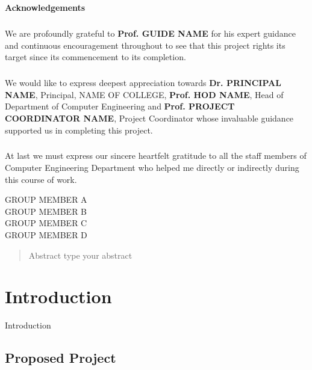 \documentclass[11pt]{report}
\begin{document}
\begin{center}
	\thispagestyle{empty}
	\LARGE{\textbf{Acknowledgements}}\\[1cm]
\end{center}
\linespread{1.13}
\large{\paragraph{}We are profoundly grateful to \textbf{Prof. GUIDE NAME} for his expert guidance
	and continuous encouragement throughout to see that this project rights its
	target since its commencement to its completion.}
\large{\paragraph{}We would like to express deepest appreciation towards \textbf{Dr. PRINCIPAL NAME},
	Principal, NAME OF COLLEGE, \textbf{Prof. HOD NAME}, 
	Head of Department of Computer Engineering and \textbf{Prof. PROJECT COORDINATOR NAME}, Project Coordinator whose
	invaluable guidance supported us in completing this project.}
\large{\paragraph{}At last we must express our sincere heartfelt gratitude to all the staff members
	of Computer Engineering Department who helped me directly or indirectly during this course of work.}
\begin{flushright}
	{
		GROUP MEMBER A\\
		GROUP MEMBER B\\
		GROUP MEMBER C\\
		GROUP MEMBER D
	}
\end{flushright}
\newpage
 
\begin{abstract}
Abstract
type your abstract
\end{abstract}

\tableofcontents





\chapter {Introduction}
\label{intro}
Introduction

\section{Proposed Project}
\end{document}
